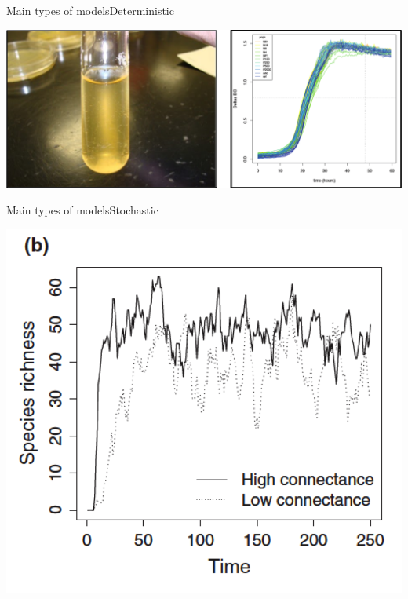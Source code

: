 \documentclass{eecslides}
\begin{document}
	\begin{frame}{Main types of models}{Deterministic}

		\begin{center}
			\includegraphics[height=0.5\textheight]{deterministic_model}
		\end{center}

	\end{frame}


	\begin{frame}{Main types of models}{Stochastic}

		\begin{center}
			\includegraphics[height=0.75\textheight]{stochastic_model}
		\end{center}

	\end{frame}
\end{document}
